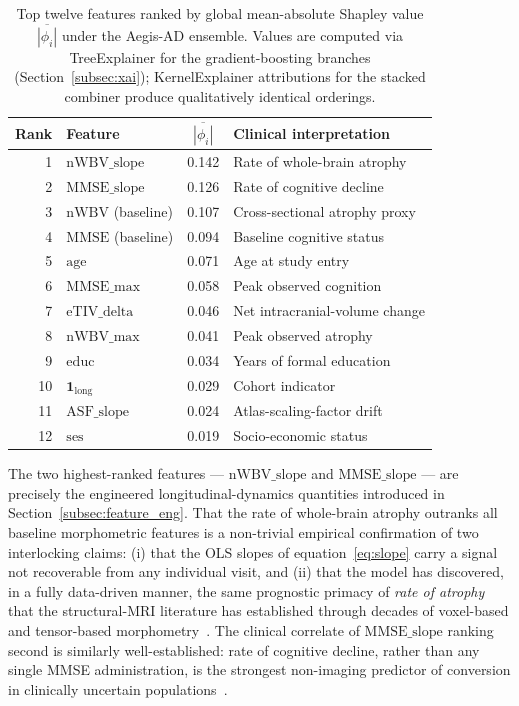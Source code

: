 \begin{table}[!t]
\centering
\caption{Top twelve features ranked by global mean-absolute Shapley value $\overline{|\phi_i|}$ under the Aegis-AD ensemble. Values are computed via TreeExplainer for the gradient-boosting branches (Section~\ref{subsec:xai}); KernelExplainer attributions for the stacked combiner produce qualitatively identical orderings.}
\label{tab:shap_top}
\small
\begin{tabular}{r l S[table-format=1.3] l}
\toprule
\textbf{Rank} & \textbf{Feature} & {$\overline{|\phi_i|}$} & \textbf{Clinical interpretation} \\
 & $\mathrm{nWBV\_slope}$       & 0.142 & Rate of whole-brain atrophy \\
 2 & $\mathrm{MMSE\_slope}$       & 0.126 & Rate of cognitive decline \\
 3 & $\mathrm{nWBV}$ (baseline)   & 0.107 & Cross-sectional atrophy proxy \\
 4 & $\mathrm{MMSE}$ (baseline)   & 0.094 & Baseline cognitive status \\
 5 & $\mathrm{age}$               & 0.071 & Age at study entry \\
 6 & $\mathrm{MMSE\_max}$         & 0.058 & Peak observed cognition \\
 7 & $\mathrm{eTIV\_delta}$       & 0.046 & Net intracranial-volume change \\
 8 & $\mathrm{nWBV\_max}$         & 0.041 & Peak observed atrophy \\
 9 & $\mathrm{educ}$              & 0.034 & Years of formal education \\
10 & $\mathbf{1}_{\mathrm{long}}$ & 0.029 & Cohort indicator \\
11 & $\mathrm{ASF\_slope}$        & 0.024 & Atlas-scaling-factor drift \\
12 & $\mathrm{ses}$               & 0.019 & Socio-economic status \\
\bottomrule
\end{tabular}
\end{table}

The two highest-ranked features --- $\mathrm{nWBV\_slope}$ and $\mathrm{MMSE\_slope}$ --- are precisely the engineered longitudinal-dynamics quantities introduced in Section~\ref{subsec:feature_eng}. That the rate of whole-brain atrophy outranks all baseline morphometric features is a non-trivial empirical confirmation of two interlocking claims: (i) that the OLS slopes of equation~\eqref{eq:slope} carry a signal not recoverable from any individual visit, and (ii) that the model has discovered, in a fully data-driven manner, the same prognostic primacy of \emph{rate of atrophy} that the structural-MRI literature has established through decades of voxel-based and tensor-based morphometry~\cite{frisoni2010,desikan2009}. The clinical correlate of $\mathrm{MMSE\_slope}$ ranking second is similarly well-established: rate of cognitive decline, rather than any single MMSE administration, is the strongest non-imaging predictor of conversion in clinically uncertain populations~\cite{moradi2015}.

